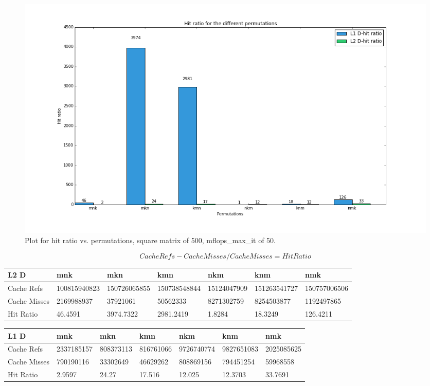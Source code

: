 \documentclass{article}
\begin{document}
\begin{figure}[H]
  \centering
  \includegraphics[scale=0.5]{hitratio.png}
  \caption{Plot for hit ratio vs. permutations, square matrix of 500, mflops\_max\_it of 50.}
 \label{fig:plot_hit ratio}
\end{figure}

\[ Cache Refs - Cache Misses / Cache Misses = Hit Ratio \]

\begin{adjustbox}{max width=\textwidth,center}
	\begin{center}
    \begin{tabular}{| l | l | l | l | l | l | l  |}
    \hline
    L2 D & mnk & mkn & kmn & nkm & knm & nmk  \\ \hline
    Cache Refs & 100815940823 & 150726065855 & 150738548844 & 15124047909 &
151263541727 & 150757006506 \\ \hline
    Cache Misses & 2169988937 & 37921061 & 
50562333 & 8271302759 & 8254503877 & 1192497865 \\ \hline
    Hit Ratio & 46.4591 & 3974.7322 & 2981.2419 & 1.8284	& 18.3249 & 126.4211 \\
    \hline
    \end{tabular}
\end{center}
\end{adjustbox}


\begin{adjustbox}{max width=\textwidth,center}
\begin{center}
    \begin{tabular}{| l | l | l | l | l | l | l  |}
    \hline
    L1 D & mnk & mkn & kmn & nkm & knm & nmk  \\ \hline
    Cache Refs & 2337185157 & 808373113 & 816761066 & 9726740774 &
9827651083 & 2025085625 \\ \hline
    Cache Misses & 790190116 & 33302649 & 
46629262 & 808869156 & 794451254 & 59968558 \\ \hline
    Hit Ratio & 2.9597 & 24.27 & 17.516 & 12.025	& 12.3703 & 33.7691 \\
    \hline
    \end{tabular}
\end{center}
\end{adjustbox}
\end{document}
